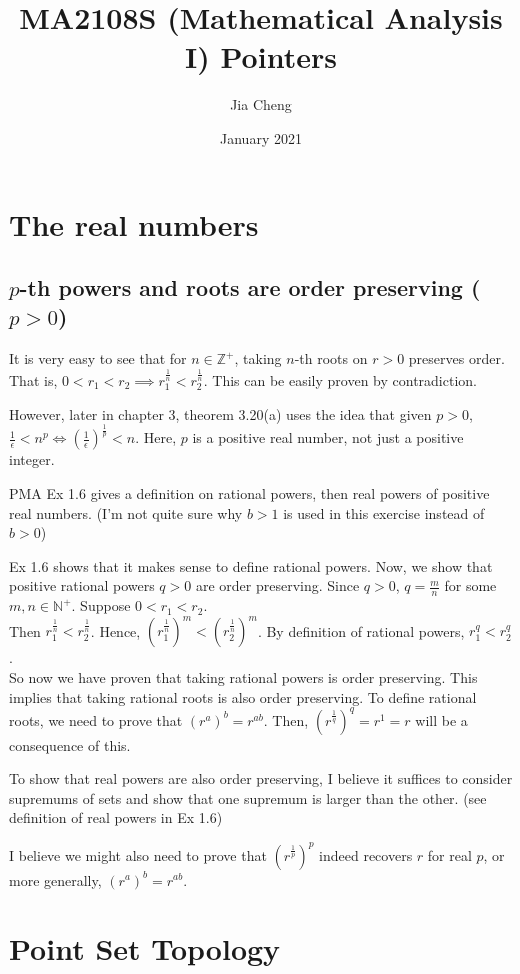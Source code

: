 \documentclass{article}
\title{MA2108S (Mathematical Analysis I) Pointers}
\author{Jia Cheng}
\date{January 2021}
\begin{document}
\maketitle

\section{The real numbers}
\subsection{$p$-th powers and roots are order preserving ($p > 0$)}
It is very easy to see that for $n\in \mathbb{Z}^+$, taking $n$-th roots on $r>0$ preserves order. That is, $0 < r_1 < r_2 \implies r_1^{\frac{1}{n}} < r_2^\frac{1}{n}$. This can be easily proven by contradiction.

However, later in chapter 3, theorem 3.20(a) uses the idea that given $p>0$, $\frac{1}{\epsilon} < n^p \iff (\frac{1}{\epsilon})^\frac{1}{p} < n$. Here, $p$ is a positive real number, not just a positive integer.


PMA Ex 1.6 gives a definition on rational powers, then real powers of positive real numbers. (I'm not quite sure why $b>1$ is used in this exercise instead of $b>0$)

Ex 1.6 shows that it makes sense to define rational powers. Now, we show that positive rational powers $q > 0$ are order preserving. Since $q>0$, $q=\frac{m}{n}$ for some $m,n\in \mathbb{N}^+$. Suppose $0<r_1<r_2$.\\
Then $r_1^\frac{1}{n} < r_2^\frac{1}{n}$. Hence, $(r_1^\frac{1}{n})^m < (r_2^\frac{1}{n})^m$. By definition of rational powers, $r_1^q < r_2^q$.\\
So now we have proven that taking rational powers is order preserving. This implies that taking rational roots is also order preserving. To define rational roots, we need to prove that $(r^a)^b=r^{ab}$. Then, $(r^\frac{1}{q})^q=r^1=r$ will be a consequence of this.

To show that real powers are also order preserving, I believe it suffices to consider supremums of sets and show that one supremum is larger than the other. (see definition of real powers in Ex 1.6)

I believe we might also need to prove that $(r^\frac{1}{p})^p$ indeed recovers $r$ for real $p$, or more generally, $(r^a)^b=r^{ab}$.

\section{Point Set Topology}
\end{document}
